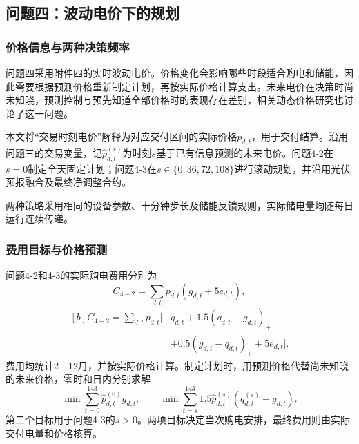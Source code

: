 \subsection{问题四：波动电价下的规划}\label{sec:q4}
\subsubsection{价格信息与两种决策频率}
问题四采用附件四的实时波动电价。价格变化会影响哪些时段适合购电和储能，因此需要根据预测价格重新制定计划，再按实际价格计算支出。未来电价在决策时尚未知晓，预测控制与预先知道全部价格时的表现存在差别，相关动态价格研究也讨论了这一问题。

本文将“交易时刻电价”解释为对应交付区间的实际价格$p_{d,t}$，用于交付结算。沿用问题三的交易变量，记$\widehat p^{(s)}_{d,t}$为时刻$s$基于已有信息预测的未来电价。问题4-2在$s=0$制定全天固定计划；问题4-3在$s\in\{0,36,72,108\}$进行滚动规划，并沿用光伏预报融合及最终净调整合约。

两种策略采用相同的设备参数、十分钟步长及储能反馈规则，实际储电量均随每日运行连续传递。

\subsubsection{费用目标与价格预测}
问题4-2和4-3的实际购电费用分别为
\begin{equation}
 C_{4-2}=\sum_{d,t}p_{d,t}(g_{d,t}+5e_{d,t}),
\end{equation}
\begin{equation}
\begin{aligned}[b]
 C_{4-3}=\sum_{d,t}p_{d,t}\bigl[&g_{d,t}
 +1.5(q_{d,t}-g_{d,t})_+\\
 &+0.5(g_{d,t}-q_{d,t})_++5e_{d,t}\bigr].
\end{aligned}\label{eq:q4-bill}
\end{equation}
费用均统计2—12月，并按实际价格计算。制定计划时，用预测价格代替尚未知晓的未来价格，零时和日内分别求解
\begin{equation}
 \min\sum_{t=0}^{143}\widehat p^{(0)}_{d,t}g_{d,t},
 \qquad
 \min\sum_{t=s}^{143}1.5\widehat p^{(s)}_{d,t}
       (q^{(s)}_{d,t}-g_{d,t}).\label{eq:q4-objectives}
\end{equation}
第二个目标用于问题4-3的$s>0$。两项目标决定当次购电安排，最终费用则由实际交付电量和价格核算。

